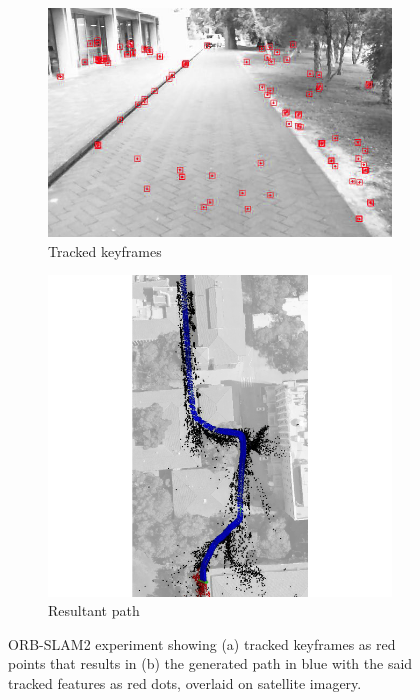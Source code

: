 \begin{figure}[H]
	\centering
	\begin{subfigure}[b]{0.45\textwidth}
		\includegraphics[width=\textwidth]{vo}
		\caption{Tracked keyframes}
		\label{fig:7:vo:1}   
	\end{subfigure} 
	\hspace{1em}         
	\begin{subfigure}[b]{0.45\textwidth}
		\includegraphics[width=\textwidth]{os_overlay}
		\caption{Resultant path}
		\label{fig:7:vo:2}
	\end{subfigure}             
	\caption[ORB-SLAM2 experiment]{ORB-SLAM2 experiment showing (a) tracked keyframes as red points that results in (b) the generated path in blue with the said tracked features as red dots, overlaid on satellite imagery.}
	\label{fig:7:vo}
\end{figure}

